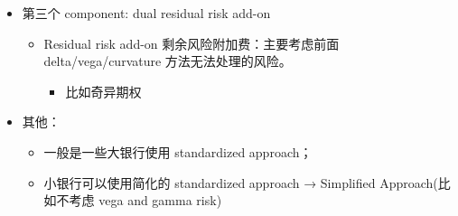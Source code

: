 \begin{itemize}
\begin{itemize}
\begin{itemize}
\begin{itemize}
            \item Default risks are handled by a \textcolor{red}{separate default risk charge}.
            \item default risk charge = each exposure * loss given default (LGD) * default risk weight
            \item LGD 和 risk weight 由 Basel Committee 设定.
            \item For example， the LGD for senior debt is specified as 75\% and the default risk for a counterparty rated A is 3\%.
            \item Equity positions are subject to a default risk charge with an LGD = 100\%.
            \item Rules for \textcolor{red}{offsetting exposures} are specified. 【允许银行在符合一定条件的情况下，对不同的风险敞口进行相互抵消，更准确地反映实际面临的违约风险。】
        \end{itemize}

        \end{itemize}
    \end{itemize}
    
\item 第三个 component: dual residual risk add-on
    \begin{itemize}
    \item Residual risk add-on 剩余风险附加费：主要考虑前面 delta/vega/curvature 方法无法处理的风险。
        \begin{itemize}
        \item 比如奇异期权
        \end{itemize}
    \end{itemize}

\item 其他：
    \begin{itemize}
    \item 一般是一些大银行使用 standardized approach；
    \item 小银行可以使用简化的 standardized approach → Simplified Approach(比如不考虑 vega and gamma risk)
    \end{itemize}
    

\end{itemize}
